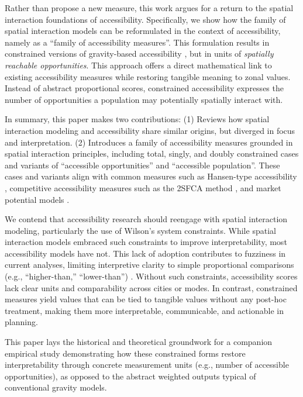 \documentclass[
  10pt,
  letterpaper,
]{article}
\begin{document}
Rather than propose a new measure, this work argues for a return to the
spatial interaction foundations of accessibility. Specifically, we show
how the family of spatial interaction models \citep{wilson1971} can be
reformulated in the context of accessibility, namely as a ``family of
accessibility measures''. This formulation results in constrained
versions of gravity-based accessibility \citep[e.g.,][]{hansen1959}, but
in units of \emph{spatially reachable opportunities}. This approach
offers a direct mathematical link to existing accessibility measures
while restoring tangible meaning to zonal values. Instead of abstract
proportional scores, constrained accessibility expresses the number of
opportunities a population may potentially spatially interact with.

In summary, this paper makes two contributions: (1) Reviews how spatial
interaction modeling and accessibility share similar origins, but
diverged in focus and interpretation. (2) Introduces a family of
accessibility measures grounded in spatial interaction principles,
including total, singly, and doubly constrained cases and variants of
``accessible opportunities'' and ``accessible population''. These cases
and variants align with common measures such as Hansen-type
accessibility \citep{hansen1959}, competitive accessibility measures
such as the 2SFCA method \citep{shen1998, luo2003}, and market potential
models
\citep{harris_market_1954, vickermanAccessibilityAttractionPotential1974}.

We contend that accessibility research should reengage with spatial
interaction modeling, particularly the use of Wilson's system
constraints. While spatial interaction models embraced such constraints
to improve interpretability, most accessibility models have not. This
lack of adoption contributes to fuzziness in current analyses, limiting
interpretive clarity to simple proportional comparisons (e.g.,
``higher-than,'' ``lower-than'')
\citep{millerAccessibilityMeasurementApplication2018}. Without such
constraints, accessibility scores lack clear units and comparability
across cities or modes. In contrast, constrained measures yield values
that can be tied to tangible values without any post-hoc treatment,
making them more interpretable, communicable, and actionable in
planning.

This paper lays the historical and theoretical groundwork for a
companion empirical study demonstrating how these constrained forms
restore interpretability through concrete measurement units (e.g.,
number of accessible opportunities), as opposed to the abstract weighted
outputs typical of conventional gravity models.
\end{document}
